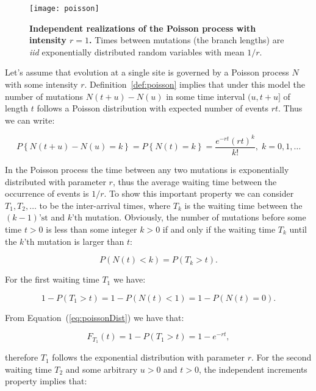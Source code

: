 \begin{figure}[H]
\centering
\texttt{[image: poisson]}
\caption{
{ \footnotesize 
{\bf Independent realizations of the Poisson process with intensity $r=1$.}
Times between mutations (the branch lengths) are \emph{iid} exponentially distributed random variables with mean $1/r$.
} %
}
\label{fig:poisson}
\end{figure}

Let's assume that evolution at a single site is governed by a Poisson process $N$ with some intensity $r$.
Definition~\ref{def:poisson} implies that under this model the number of mutations $N(t+u)-N(u)$ in some time interval $(u,t+u]$ of length $t$ follows a Poisson distribution with expected number of events $r t$.
Thus we can write:

\begin{equation}
P\left\{ N(t+u)-N(u)=k\right\} =P\left\{ N(t)=k\right\}=\frac{e^{-r t}(r t)^{k}}{k!},\; k=0,1,\ldots
\label{eq:poissonDist} 
\end{equation}

In the Poisson process the time between any two mutations is exponentially distributed with parameter $r$, thus the average waiting time between the occurrence of events is $1/r$.
To show this important property we can consider $T_1,T_2,\ldots$ to be the inter-arrival times, where $T_k$ is the waiting time between the $(k-1)\text{'st}$ and $k\text{'th}$ mutation. 
Obviously, the number of mutations before some time $t>0$ is less than some integer $k>0$ if and only if the waiting time $T_k$ until the $k\text{'th}$ mutation is larger than $t$:

\begin{equation}
P\left(N(t)<k\right)=P\left(T_{k}>t\right).
\end{equation}

\noindent
For the first waiting time $T_1$ we have:

\begin{equation}
1-P\left(T_{1}>t\right)=1-P\left(N(t)<1\right)=1-P\left(N(t)=0\right).
\end{equation}

\noindent
From Equation~(\ref{eq:poissonDist}) we have that:

\begin{equation}
F_{T_{1}}(t)=1-P\left(T_{1}>t\right)=1-e^{-r t},
\end{equation}

\noindent
therefore $T_1$ follows the exponential distribution with parameter $r$.
For the second waiting time $T_2$ and some arbitrary $u>0$ and $t>0$, the independent increments property implies that:

